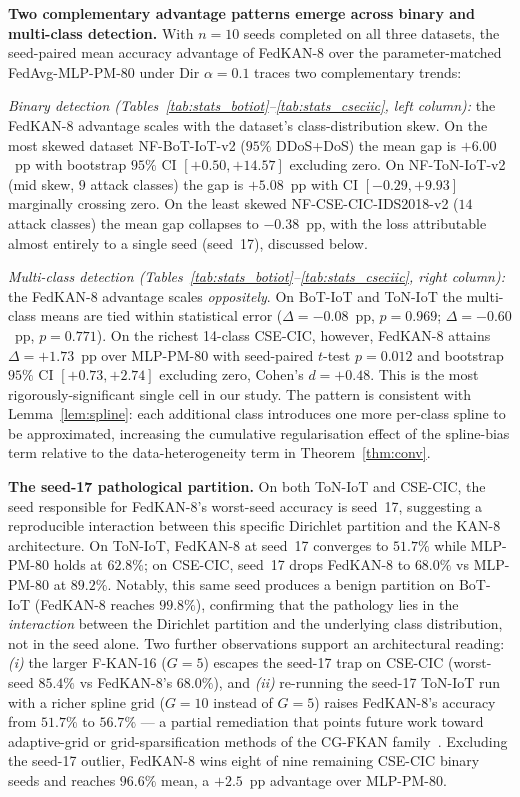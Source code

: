 \textbf{Two complementary advantage patterns emerge across binary and multi-class detection.} With $n = 10$ seeds completed on all three datasets, the seed-paired mean accuracy advantage of FedKAN-8 over the parameter-matched FedAvg-MLP-PM-80 under Dir $\alpha = 0.1$ traces two complementary trends:

\noindent\textit{Binary detection (Tables~\ref{tab:stats_botiot}--\ref{tab:stats_cseciic}, left column):} the FedKAN-8 advantage scales with the dataset's class-distribution skew. On the most skewed dataset NF-BoT-IoT-v2 ($95\%$ DDoS+DoS) the mean gap is $+6.00$~pp with bootstrap $95\%$ CI $[+0.50, +14.57]$ excluding zero. On NF-ToN-IoT-v2 (mid skew, $9$ attack classes) the gap is $+5.08$~pp with CI $[-0.29, +9.93]$ marginally crossing zero. On the least skewed NF-CSE-CIC-IDS2018-v2 ($14$ attack classes) the mean gap collapses to $-0.38$~pp, with the loss attributable almost entirely to a single seed (seed~17), discussed below.

\noindent\textit{Multi-class detection (Tables~\ref{tab:stats_botiot}--\ref{tab:stats_cseciic}, right column):} the FedKAN-8 advantage scales \emph{oppositely}. On BoT-IoT and ToN-IoT the multi-class means are tied within statistical error ($\Delta = -0.08$~pp, $p = 0.969$; $\Delta = -0.60$~pp, $p = 0.771$). On the richest 14-class CSE-CIC, however, FedKAN-8 attains $\Delta = +1.73$~pp over MLP-PM-80 with seed-paired $t$-test $p = 0.012$ and bootstrap $95\%$ CI $[+0.73, +2.74]$ excluding zero, Cohen's $d = +0.48$. This is the most rigorously-significant single cell in our study. The pattern is consistent with Lemma~\ref{lem:spline}: each additional class introduces one more per-class spline to be approximated, increasing the cumulative regularisation effect of the spline-bias term relative to the data-heterogeneity term in Theorem~\ref{thm:conv}.

\textbf{The seed-17 pathological partition.} On both ToN-IoT and CSE-CIC, the seed responsible for FedKAN-8's worst-seed accuracy is seed~17, suggesting a reproducible interaction between this specific Dirichlet partition and the KAN-8 architecture. On ToN-IoT, FedKAN-8 at seed~17 converges to $51.7\%$ while MLP-PM-80 holds at $62.8\%$; on CSE-CIC, seed~17 drops FedKAN-8 to $68.0\%$ vs MLP-PM-80 at $89.2\%$. Notably, this same seed produces a benign partition on BoT-IoT (FedKAN-8 reaches $99.8\%$), confirming that the pathology lies in the \emph{interaction} between the Dirichlet partition and the underlying class distribution, not in the seed alone. Two further observations support an architectural reading: \emph{(i)} the larger F-KAN-16 ($G = 5$) escapes the seed-17 trap on CSE-CIC (worst-seed $85.4\%$ vs FedKAN-8's $68.0\%$), and \emph{(ii)} re-running the seed-17 ToN-IoT run with a richer spline grid ($G = 10$ instead of $G = 5$) raises FedKAN-8's accuracy from $51.7\%$ to $56.7\%$ --- a partial remediation that points future work toward adaptive-grid or grid-sparsification methods of the CG-FKAN family~\cite{yu2025cgfkan}. Excluding the seed-17 outlier, FedKAN-8 wins eight of nine remaining CSE-CIC binary seeds and reaches $96.6\%$ mean, a $+2.5$~pp advantage over MLP-PM-80.

